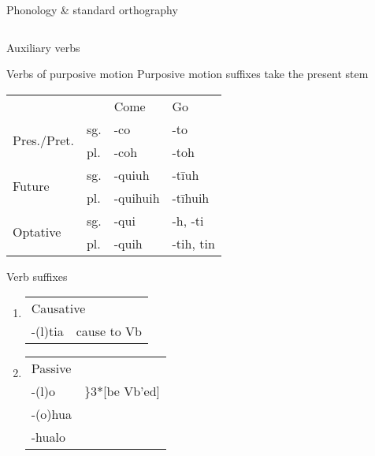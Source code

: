 \documentclass[12pt]{beamer}
\newcommand{\nah}[1]{\textcolor{nahgrn}{#1}}
\newcommand{\trs}[1]{\textcolor{nahblu}{#1}}
\begin{document}
\begin{frame}
\begin{columns}[t]
\begin{column}{.22\linewidth}
\begin{block}{Phonology \& standard orthography}
\begin{threeparttable}
\begin{tablenotes}
\begin{frame}
\begin{frame}
\begin{columns}[t]
\begin{column}{.18\linewidth}
\begin{block}{Auxiliary verbs}
                      \end{block}
                      \begin{block}{Verbs of purposive motion}
                        Purposive motion suffixes take the present stem
                        \begin{tabular}{llll}
                          &     & \trs{Come}     & \trs{Go}          \\
                          \multirow{2}{*}{Pres./Pret.} & sg. & \nah{-co}      & \nah{-to}         \\
                          & pl. & \nah{-coh}     & \nah{-toh}        \\
                          \multirow{2}{*}{Future}       & sg. & \nah{-quiuh}   & \nah{-tīuh}       \\
                          & pl. & \nah{-quihuih} & \nah{-tīhuih}     \\
                          \multirow{2}{*}{Optative}  & sg. & \nah{-qui}     & \nah{-h,   -ti}   \\
                          & pl. & \nah{-quih}    & \nah{-tih,   tin} \\
                        \end{tabular}
                      \end{block}
                      \begin{block}{Verb suffixes}
                        \begin{enumerate}
                        \item 
                          \begin{tabular}[t]{ll}
                            \multicolumn{2}{l}{Causative}\\
                            \nah{-(l)tia} & \trs{cause to Vb}
                          \end{tabular}
                        \item
                          \begin{tabular}[t]{ll}
                            \multicolumn{2}{l}{Passive}\\
                            \nah{-(l)o} & \trs{\hspace{-1em}\rdelim\}{3}{*}[be Vb'ed]}\\
                            \nah{-(o)hua} & \\
                            \nah{-hualo} & \\
                          \end{tabular}

\end{enumerate}
\end{block}
\end{column}
\end{columns}
\end{frame}
\end{frame}
\end{tablenotes}
\end{threeparttable}
\end{block}
\end{column}
\end{columns}
\end{frame}
\end{document}
